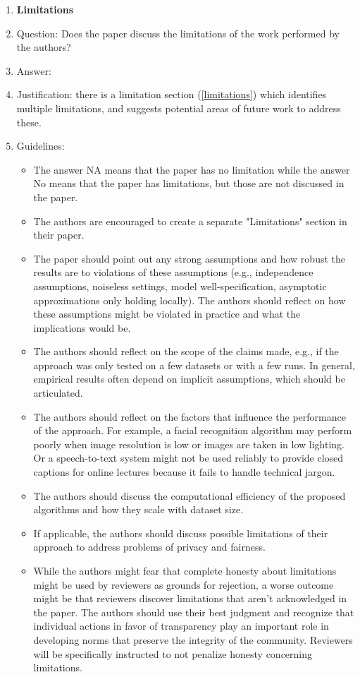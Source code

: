 \documentclass{article}
\begin{document}
\begin{enumerate}
\item {\bf Limitations}
    \item[] Question: Does the paper discuss the limitations of the work performed by the authors?
    \item[] Answer: \answerYes{} %
    \item[] Justification: there is a limitation section (\cref{limitations}) which identifies multiple limitations, and suggests potential areas of future work to address these.
    \item[] Guidelines:
    \begin{itemize}
        \item The answer NA means that the paper has no limitation while the answer No means that the paper has limitations, but those are not discussed in the paper. 
        \item The authors are encouraged to create a separate "Limitations" section in their paper.
        \item The paper should point out any strong assumptions and how robust the results are to violations of these assumptions (e.g., independence assumptions, noiseless settings, model well-specification, asymptotic approximations only holding locally). The authors should reflect on how these assumptions might be violated in practice and what the implications would be.
        \item The authors should reflect on the scope of the claims made, e.g., if the approach was only tested on a few datasets or with a few runs. In general, empirical results often depend on implicit assumptions, which should be articulated.
        \item The authors should reflect on the factors that influence the performance of the approach. For example, a facial recognition algorithm may perform poorly when image resolution is low or images are taken in low lighting. Or a speech-to-text system might not be used reliably to provide closed captions for online lectures because it fails to handle technical jargon.
        \item The authors should discuss the computational efficiency of the proposed algorithms and how they scale with dataset size.
        \item If applicable, the authors should discuss possible limitations of their approach to address problems of privacy and fairness.
        \item While the authors might fear that complete honesty about limitations might be used by reviewers as grounds for rejection, a worse outcome might be that reviewers discover limitations that aren't acknowledged in the paper. The authors should use their best judgment and recognize that individual actions in favor of transparency play an important role in developing norms that preserve the integrity of the community. Reviewers will be specifically instructed to not penalize honesty concerning limitations.
    \end{itemize}


\end{enumerate}
\end{document}
